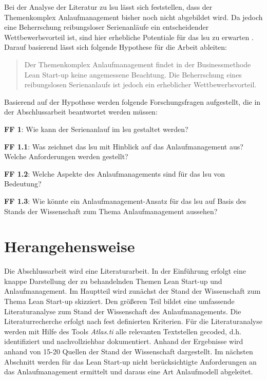 Bei der Analyse der Literatur zu \gls{lsu} lässt sich feststellen, dass der Themenkomplex Anlaufmanagement bisher noch nicht abgebildet wird. Da jedoch eine Beherrschung reibungsloser Serienanläufe ein entscheidender Wettbewerbsvorteil ist, sind hier erhebliche Potentiale für das \gls{lsu} zu erwarten \cite[S.XI]{Bischoff2007}. Darauf basierend lässt sich folgende Hypothese für die Arbeit ableiten: 

\begin{quotation}
Der Themenkomplex Anlaufmanagement findet in der Businessmethode Lean Start-up keine angemessene Beachtung. Die Beherrschung eines reibungslosen Serienanlaufs ist jedoch ein erheblicher Wettbewerbsvorteil. %
\end{quotation}
Basierend auf der Hypothese werden folgende Forschungsfragen aufgestellt, die in der Abschlussarbeit beantwortet werden müssen: 

\textbf{FF 1}: Wie kann der Serienanlauf im \gls{lsu} gestaltet werden? 

\textbf{FF 1.1}: Was zeichnet das \gls{lsu} mit Hinblick auf das Anlaufmanagement aus? Welche Anforderungen werden gestellt?

\textbf{FF 1.2}: Welche Aspekte des Anlaufmanagements sind für das \gls{lsu} von Bedeutung? 

\textbf{FF 1.3}: Wie könnte ein Anlaufmanagement-Ansatz für das \gls{lsu} auf Basis des Stands der Wissenschaft zum Thema Anlaufmanagement aussehen?  


\section{Herangehensweise}
Die Abschlussarbeit wird eine Literaturarbeit. In der Einführung erfolgt eine knappe Darstellung der zu behandelnden Themen Lean Start-up und Anlaufmanagement. Im Hauptteil wird zunächst der Stand der Wissenschaft zum Thema Lean Start-up skizziert. Den größeren Teil bildet eine umfassende Literaturanalyse zum Stand der Wissenschaft des Anlaufmanagements. Die Literaturrecherche erfolgt nach fest definierten Kriterien. Für die Literaturanalyse werden mit Hilfe des Tools \textit{Atlas.ti} alle relevanten Textstellen gecoded, d.h. identifiziert und nachvollziehbar dokumentiert. Anhand der  Ergebnisse wird anhand von 15-20 Quellen der Stand der Wissenschaft dargestellt. Im nächsten Abschnitt werden für das Lean Start-up nicht berücksichtigte Anforderungen an das Anlaufmanagement ermittelt und daraus eine Art Anlaufmodell abgeleitet. 

